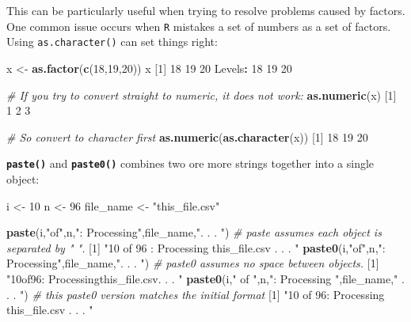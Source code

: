 \documentclass[
]{book}
\newenvironment{Shaded}{\begin{snugshade}}{\end{snugshade}}
\newcommand{\CommentTok}[1]{\textcolor[rgb]{0.56,0.35,0.01}{\textit{#1}}}
\newcommand{\DecValTok}[1]{\textcolor[rgb]{0.00,0.00,0.81}{#1}}
\newcommand{\KeywordTok}[1]{\textcolor[rgb]{0.13,0.29,0.53}{\textbf{#1}}}
\newcommand{\NormalTok}[1]{#1}
\newcommand{\OperatorTok}[1]{\textcolor[rgb]{0.81,0.36,0.00}{\textbf{#1}}}
\newcommand{\StringTok}[1]{\textcolor[rgb]{0.31,0.60,0.02}{#1}}
\begin{document}
This can be particularly useful when trying to resolve problems caused by factors. One common issue occurs when \texttt{R} mistakes a set of numbers as a set of factors. Using \texttt{as.character()} can set things right:

\begin{Shaded}
\begin{Highlighting}[]
\NormalTok{x <-}\StringTok{ }\KeywordTok{as.factor}\NormalTok{(}\KeywordTok{c}\NormalTok{(}\DecValTok{18}\NormalTok{,}\DecValTok{19}\NormalTok{,}\DecValTok{20}\NormalTok{))}
\NormalTok{x}
\NormalTok{[}\DecValTok{1}\NormalTok{] }\DecValTok{18} \DecValTok{19} \DecValTok{20}
\NormalTok{Levels}\OperatorTok{:}\StringTok{ }\DecValTok{18} \DecValTok{19} \DecValTok{20}

\CommentTok{# If you try to convert straight to numeric, it does not work:}
\KeywordTok{as.numeric}\NormalTok{(x)}
\NormalTok{[}\DecValTok{1}\NormalTok{] }\DecValTok{1} \DecValTok{2} \DecValTok{3}

\CommentTok{# So convert to character first}
\KeywordTok{as.numeric}\NormalTok{(}\KeywordTok{as.character}\NormalTok{(x))}
\NormalTok{[}\DecValTok{1}\NormalTok{] }\DecValTok{18} \DecValTok{19} \DecValTok{20}
\end{Highlighting}
\end{Shaded}

\textbf{\texttt{paste()}} and \textbf{\texttt{paste0()}} combines two ore more strings together into a single object:

\begin{Shaded}
\begin{Highlighting}[]
\NormalTok{i <-}\StringTok{ }\DecValTok{10}
\NormalTok{n <-}\StringTok{ }\DecValTok{96}
\NormalTok{file_name <-}\StringTok{ "this_file.csv"}

\KeywordTok{paste}\NormalTok{(i,}\StringTok{"of"}\NormalTok{,n,}\StringTok{": Processing"}\NormalTok{,file_name,}\StringTok{". . . "}\NormalTok{) }\CommentTok{# paste assumes each object is separated by " ".}
\NormalTok{[}\DecValTok{1}\NormalTok{] }\StringTok{"10 of 96 : Processing this_file.csv . . . "}
\KeywordTok{paste0}\NormalTok{(i,}\StringTok{"of"}\NormalTok{,n,}\StringTok{": Processing"}\NormalTok{,file_name,}\StringTok{". . . "}\NormalTok{) }\CommentTok{# paste0 assumes no space between objects.}
\NormalTok{[}\DecValTok{1}\NormalTok{] }\StringTok{"10of96: Processingthis_file.csv. . . "}
\KeywordTok{paste0}\NormalTok{(i,}\StringTok{" of "}\NormalTok{,n,}\StringTok{": Processing "}\NormalTok{,file_name,}\StringTok{" . . . "}\NormalTok{) }\CommentTok{# this paste0 version matches the initial format}
\NormalTok{[}\DecValTok{1}\NormalTok{] }\StringTok{"10 of 96: Processing this_file.csv . . . "}
\end{Highlighting}
\end{Shaded}
\end{document}
